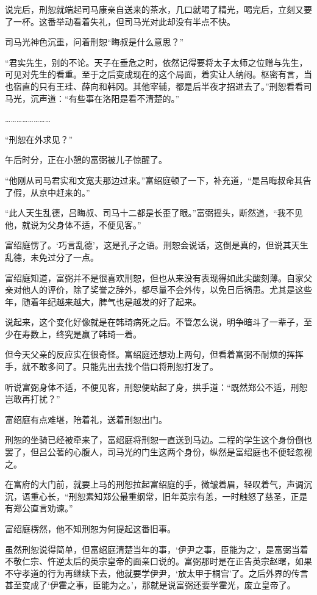 说完后，刑恕就端起司马康亲自送来的茶水，几口就喝了精光，喝完后，立刻又要了一杯。这番举动看着失礼，但司马光对此却没有半点不快。

司马光神色沉重，问着刑恕“晦叔是什么意思？”

“君实先生，别的不论。天子在垂危之时，依然记得要将太子太师之位赠与先生，可见对先生的看重。至于之后变成现在的这个局面，着实让人纳闷。枢密有言，当也宿直的只有王珪、薛向和韩冈。其他宰辅，都是后半夜才招进去了。”刑恕看看司马光，沉声道：“有些事在洛阳是看不清楚的。”

……………………

“刑恕在外求见？”

午后时分，正在小憩的富弼被儿子惊醒了。

“他刚从司马君实和文宽夫那边过来。”富绍庭顿了一下，补充道，“是吕晦叔命其告了假，从京中赶来的。”

“此人天生乱德，吕晦叔、司马十二都是长歪了眼。”富弼摇头，断然道，“我不见他，就说为父身体不适，不便见客。”

富绍庭愣了。‘巧言乱德’，这是孔子之语。刑恕会说话，这倒是真的，但说其天生乱德，未免过分了一点。

富绍庭知道，富弼并不是很喜欢刑恕，但也从来没有表现得如此尖酸刻薄。自家父亲对他人的评价，除了奖誉之辞外，都尽量不会外传，以免日后祸患。尤其是这些年，随着年纪越来越大，脾气也是越发的好了起来。

说起来，这个变化好像就是在韩琦病死之后。不管怎么说，明争暗斗了一辈子，至少在寿数上，终究是赢了韩琦一着。

但今天父亲的反应实在很奇怪。富绍庭还想劝上两句，但看着富弼不耐烦的挥挥手，就不敢多问了。只能先出去找个借口将刑恕打发了。

听说富弼身体不适，不便见客，刑恕便站起了身，拱手道：“既然郑公不适，刑恕岂敢再打扰？”

富绍庭有点难堪，陪着礼，送着刑恕出门。

刑恕的坐骑已经被牵来了，富绍庭将刑恕一直送到马边。二程的学生这个身份倒也罢了，但吕公著的心腹人，司马光的门生这两个身份，纵然是富绍庭也不便轻忽视之。

在富府的大门前，就要上马的刑恕拉起富绍庭的手，微皱着眉，轻叹着气，声调沉沉，语重心长，“刑恕素知郑公最重纲常，旧年英宗有恙，一时触怒了慈圣，正是有郑公直言劝谏。”

富绍庭楞然，他不知刑恕为何提起这番旧事。

虽然刑恕说得简单，但富绍庭清楚当年的事，‘伊尹之事，臣能为之’，是富弼当着不敬仁宗、忤逆太后的英宗皇帝的面亲口说的。富弼那时是在正告英宗赵曙，如果不守孝道的行为再继续下去，他就要学伊尹，‘放太甲于桐宫’了。之后外界的传言甚至变成了‘伊霍之事，臣能为之。’，那就是说富弼还要学霍光，废立皇帝了。

